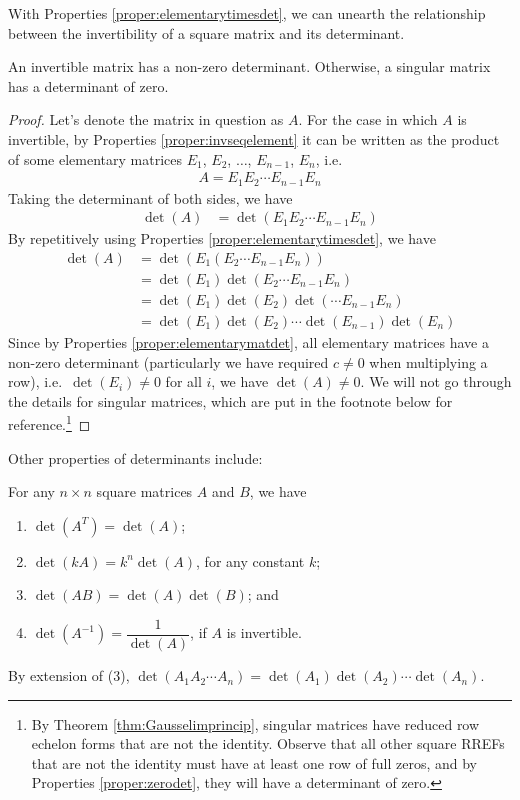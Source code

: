 With Properties \ref{proper:elementarytimesdet}, we can unearth the relationship between the invertibility of a square matrix and its determinant.
\begin{proper}
\label{proper:invnonzerodet}
An invertible matrix has a non-zero determinant. Otherwise, a singular matrix has a determinant of zero.
\end{proper}
\begin{proof}
Let's denote the matrix in question as $A$. For the case in which $A$ is invertible, by Properties \ref{proper:invseqelement} it can be written as the product of some elementary matrices $E_1$, $E_2$, $\ldots$, $E_{n-1}$, $E_n$, i.e.\
\begin{align*}
A = E_{1}E_{2} \cdots E_{n-1}E_n
\end{align*}
Taking the determinant of both sides, we have
\begin{align*}
\det(A) &= \det(E_{1}E_{2} \cdots E_{n-1}E_n)
\end{align*}
By repetitively using Properties \ref{proper:elementarytimesdet}, we have
\begin{align*}
\det(A) &= \det(E_{1}(E_{2} \cdots E_{n-1}E_n)) \\
&= \det(E_1) \det(E_{2} \cdots E_{n-1}E_n) \\
&= \det(E_1) \det(E_{2}) \det(\cdots E_{n-1}E_n) \\
&= \det(E_1) \det(E_{2}) \cdots \det(E_{n-1})\det(E_n)
\end{align*}
Since by Properties \ref{proper:elementarymatdet}, all elementary matrices have a non-zero determinant (particularly we have required $c \neq 0$ when multiplying a row), i.e.\ $\det(E_i) \neq 0$ for all $i$, we have $\det(A) \neq 0$. We will not go through the details for singular matrices, which are put in the footnote below for reference.\footnote{By Theorem \ref{thm:Gausselimprincip}, singular matrices have reduced row echelon forms that are not the identity. Observe that all other square RREFs that are not the identity must have at least one row of full zeros, and by Properties \ref{proper:zerodet}, they will have a determinant of zero.} 
\end{proof}
Other properties of determinants include:
\begin{proper}
\label{proper:properdet}
For any $n \times n$ square matrices $A$ and $B$, we have
\begin{enumerate}
\item $\det(A^T) = \det(A)$;
\item $\det(kA) = k^n \det(A)$, for any constant $k$;
\item $\det(AB) = \det(A)\det(B)$; and
\item $\det(A^{-1}) = \dfrac{1}{\det(A)}$, if $A$ is invertible.
\end{enumerate}
By extension of (3), $\det(A_1A_2\cdots A_n) = \det(A_1)\det(A_2)\cdots\det(A_n)$.
\end{proper}
